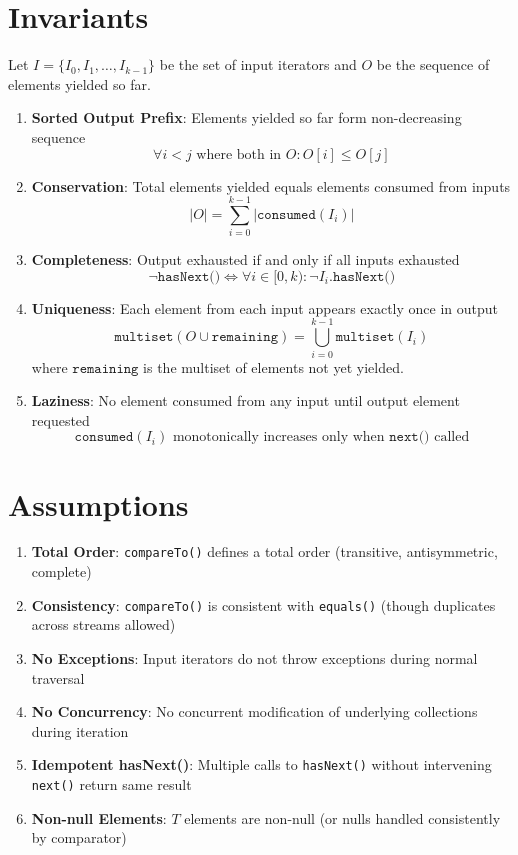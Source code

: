 \documentclass[11pt]{article}
\begin{document}
\section{Invariants}

Let $I = \{I_0, I_1, \ldots, I_{k-1}\}$ be the set of input iterators and $O$ be the sequence of elements yielded so far.

\begin{enumerate}
    \item \textbf{Sorted Output Prefix}: Elements yielded so far form non-decreasing sequence
    \[
    \forall i < j \text{ where both in } O: O[i] \leq O[j]
    \]

    \item \textbf{Conservation}: Total elements yielded equals elements consumed from inputs
    \[
    |O| = \sum_{i=0}^{k-1} |\texttt{consumed}(I_i)|
    \]

    \item \textbf{Completeness}: Output exhausted if and only if all inputs exhausted
    \[
    \neg \texttt{hasNext()} \Leftrightarrow \forall i \in [0, k): \neg I_i.\texttt{hasNext()}
    \]

    \item \textbf{Uniqueness}: Each element from each input appears exactly once in output
    \[
    \texttt{multiset}(O \cup \texttt{remaining}) = \bigcup_{i=0}^{k-1} \texttt{multiset}(I_i)
    \]
    where $\texttt{remaining}$ is the multiset of elements not yet yielded.

    \item \textbf{Laziness}: No element consumed from any input until output element requested
    \[
    \texttt{consumed}(I_i) \text{ monotonically increases only when } \texttt{next()} \text{ called}
    \]
\end{enumerate}

\section{Assumptions}

\begin{enumerate}
    \item \textbf{Total Order}: \texttt{compareTo()} defines a total order (transitive, antisymmetric, complete)
    \item \textbf{Consistency}: \texttt{compareTo()} is consistent with \texttt{equals()} (though duplicates across streams allowed)
    \item \textbf{No Exceptions}: Input iterators do not throw exceptions during normal traversal
    \item \textbf{No Concurrency}: No concurrent modification of underlying collections during iteration
    \item \textbf{Idempotent hasNext()}: Multiple calls to \texttt{hasNext()} without intervening \texttt{next()} return same result
    \item \textbf{Non-null Elements}: $T$ elements are non-null (or nulls handled consistently by comparator)
\end{enumerate}
\end{document}
